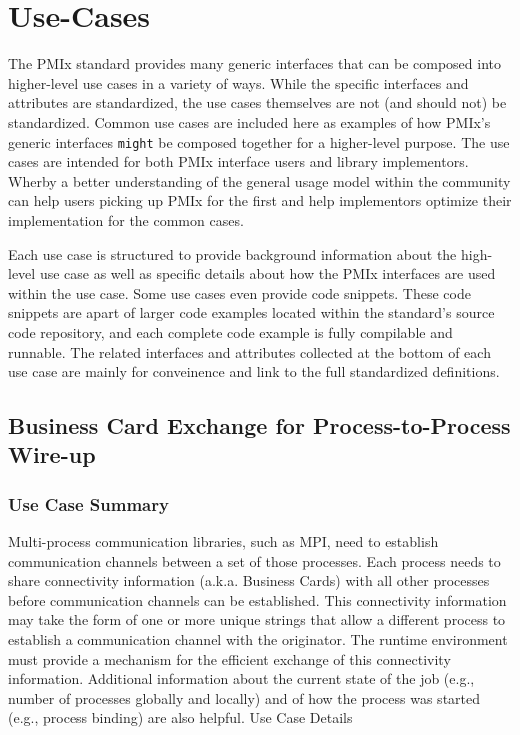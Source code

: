 \chapter{Use-Cases}
\label{app:use-cases}

The \ac{PMIx} standard provides many generic interfaces that can be composed into higher-level use cases in a variety of ways.  While the specific interfaces and attributes are standardized, the use cases themselves are not (and should not) be standardized.  Common use cases are included here as examples of how PMIx's generic interfaces \texttt{might} be composed together for a higher-level purpose. The use cases are intended for both \ac{PMIx} interface users and library implementors.  Wherby a better understanding of the general usage model within the community can help users picking up PMIx for the first and help implementors optimize their implementation for the common cases.

Each use case is structured to provide background information about the high-level use case as well as specific details about how the PMIx interfaces are used within the use case.  Some use cases even provide code snippets.  These code snippets are apart of larger code examples located within the standard's source code repository, and each complete code example is fully compilable and runnable. The related interfaces and attributes collected at the bottom of each use case are mainly for conveinence and link to the full standardized definitions.

\section {Business Card Exchange for Process-to-Process Wire-up}
\label{app:uc-business-card-exchange}

\subsection{Use Case Summary}

Multi-process communication libraries, such as MPI, need to establish communication channels between a set of those processes. Each process needs to share connectivity information (a.k.a. Business Cards) with all other processes before communication channels can be established. This connectivity information may take the form of one or more unique strings that allow a different process to establish a communication channel with the originator. The runtime environment must provide a mechanism for the efficient exchange of this connectivity information. Additional information about the current state of the job (e.g., number of processes globally and locally) and of how the process was started (e.g., process binding) are also helpful.
Use Case Details


